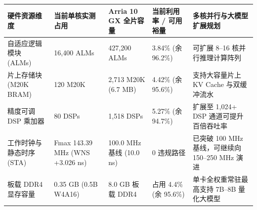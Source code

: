 \documentclass[11pt,a4paper]{article}
\begin{document}
{\footnotesize\renewcommand{\arraystretch}{1.14}\begin{longtable}{@{}L{0.19\textwidth}L{0.16\textwidth}L{0.16\textwidth}L{0.15\textwidth}L{0.24\textwidth}@{}}\toprule

\textbf{硬件资源维度} & \textbf{当前单核实测占用} & \textbf{Arria 10 GX 全片容量} & \textbf{当前利用率 /\allowbreak{} 可用裕量} & \textbf{多核并行与大模型扩展规划}\\\midrule\endhead

自适应逻辑模块 (\allowbreak{}ALMs)\allowbreak{} & 16,\allowbreak{}400 ALMs & 427,\allowbreak{}200 ALMs & 3.84\% (\allowbreak{}余 96.2\%)\allowbreak{} & 可扩展 8–16 核并行推理计算阵列\\[2pt]

片上存储块 (\allowbreak{}M20K BRAM)\allowbreak{} & 120 M20K & 2,\allowbreak{}713 M20K (\allowbreak{}6.7 MB)\allowbreak{} & 4.42\% (\allowbreak{}余 95.6\%)\allowbreak{} & 支持大容量片上 KV Cache 与双缓冲流水\\[2pt]

精度可调 DSP 乘加器 & 80 DSPs & 1,\allowbreak{}518 DSPs & 5.27\% (\allowbreak{}余 94.7\%)\allowbreak{} & 扩展至 1,\allowbreak{}024+\allowbreak{} DSP 通道可提升百倍吞吐率\\[2pt]

工作时钟与静态时序 (\allowbreak{}STA)\allowbreak{} & Fmax 143.39 MHz (\allowbreak{}WNS +\allowbreak{}3.026 ns)\allowbreak{} & 100.0 MHz 基线 (\allowbreak{}10.0 ns)\allowbreak{} & 0 违规路径 & 已突破 100 MHz 基线，可继续向 150–250 MHz 演进\\[2pt]

板载 DDR4 显存容量 & 0.35 GB (\allowbreak{}0.5B W4A16)\allowbreak{} & 8.0 GB 板载 DDR4 & 占用 4.4\% (\allowbreak{}余 95.6\%)\allowbreak{} & 单卡全权重常驻最高支持 7B–8B 量化大模型\\[2pt]

\bottomrule\end{longtable}}
\end{document}
